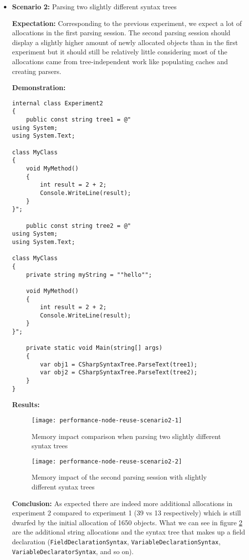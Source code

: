 \begin{itemize}
\item \textbf{Scenario 2:} Parsing two slightly different syntax trees

\textbf{Expectation:} Corresponding to the previous experiment, we expect a lot of allocations in the first parsing session. The second parsing session should display a slightly higher amount of newly allocated objects than in the first experiment but it should still be relatively little considering most of the allocations came from tree-independent work like populating caches and creating parsers.

\textbf{Demonstration:} 

\begin{lstlisting}
internal class Experiment2
{
	public const string tree1 = @"
using System;
using System.Text;

class MyClass 
{
    void MyMethod()
    {
        int result = 2 + 2;
        Console.WriteLine(result);
    }
}";

	public const string tree2 = @"
using System;
using System.Text;

class MyClass 
{
    private string myString = ""hello"";

    void MyMethod()
    {
        int result = 2 + 2;
        Console.WriteLine(result);
    }
}";

	private static void Main(string[] args)
	{
		var obj1 = CSharpSyntaxTree.ParseText(tree1);
		var obj2 = CSharpSyntaxTree.ParseText(tree2);
	}
}
\end{lstlisting}

\textbf{Results:}

\begin{figure}[H]
\centering
\texttt{[image: performance-node-reuse-scenario2-1]}
\caption{Memory impact comparison when parsing two slightly different syntax trees}
\label{img:performance-node-reuse-scenario2-1}
\end{figure}

\begin{figure}[H]
\centering
\texttt{[image: performance-node-reuse-scenario2-2]}
\caption{Memory impact of the second parsing session with slightly different syntax trees}
\label{img:performance-node-reuse-scenario2-2}
\end{figure}

\textbf{Conclusion:} As expected there are indeed more additional allocations in experiment 2 compared to experiment 1 (39 vs 13 respectively) which is still dwarfed by the initial allocation of 1650 objects. What we can see in figure \ref{img:performance-node-reuse-scenario2-2} are the additional string allocations and the syntax tree that makes up a field declaration (\texttt{FieldDeclarationSyntax}, \texttt{VariableDeclarationSyntax}, \texttt{VariableDeclaratorSyntax}, and so on).


\end{itemize}
